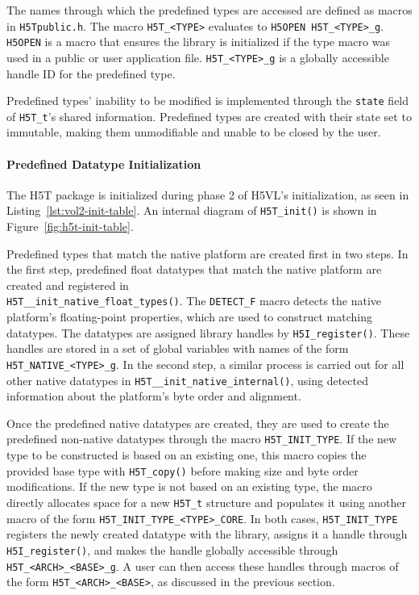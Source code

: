 The names through which the predefined types are accessed are defined as macros in \texttt{H5Tpublic.h}. The macro \texttt{H5T\_<TYPE>} evaluates to \texttt{H5OPEN H5T\_<TYPE>\_g}. \texttt{H5OPEN} is a macro that ensures the library is initialized if the type macro was used in a public or user application file. \texttt{H5T\_<TYPE>\_g} is a globally accessible handle ID for the predefined type.

Predefined types' inability to be modified is implemented through the \texttt{state} field of \texttt{H5T\_t}'s shared information. Predefined types are created with their state set to immutable, making them unmodifiable and unable to be closed by the user.

\paragraph{Predefined Datatype Initialization} The H5T package is initialized during phase 2 of H5VL's initialization, as seen in Listing~\ref{lst:vol2-init-table}. An internal diagram of \texttt{H5T\_init()} is shown in Figure~\ref{fig:h5t-init-table}.

Predefined types that match the native platform are created first in two steps. In the first step, predefined float datatypes that match the native platform are created and registered in \\ \texttt{H5T\_\_init\_native\_float\_types()}. The \texttt{DETECT\_F} macro detects the native platform's floating-point properties, which are used to construct matching datatypes. The datatypes are assigned library handles by \texttt{H5I\_register()}. These handles are stored in a set of global variables with names of the form \texttt{H5T\_NATIVE\_<TYPE>\_g}. In the second step, a similar process is carried out for all other native datatypes in \texttt{H5T\_\_init\_native\_internal()}, using detected information about the platform's byte order and alignment.

Once the predefined native datatypes are created, they are used to create the predefined non-native datatypes through the macro \texttt{H5T\_INIT\_TYPE}. If the new type to be constructed is based on an existing one, this macro copies the provided base type with \texttt{H5T\_copy()} before making size and byte order modifications. If the new type is not based on an existing type, the macro directly allocates space for a new \texttt{H5T\_t} structure and populates it using another macro of the form \texttt{H5T\_INIT\_TYPE\_<TYPE>\_CORE}. In both cases, \texttt{H5T\_INIT\_TYPE} registers the newly created datatype with the library, assigns it a handle through \texttt{H5I\_register()}, and makes the handle globally accessible through \texttt{H5T\_<ARCH>\_<BASE>\_g}. A user can then access these handles through macros of the form \texttt{H5T\_<ARCH>\_<BASE>}, as discussed in the previous section. 

